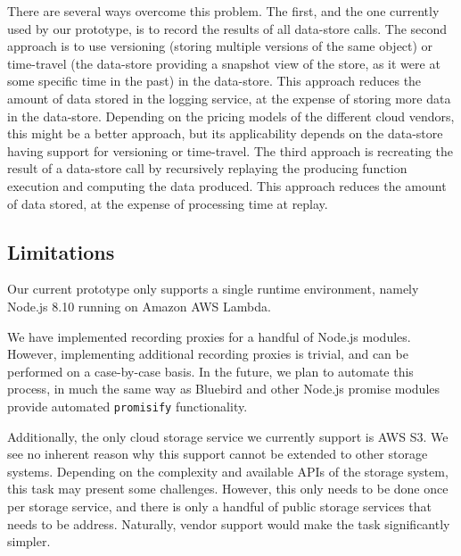 There are several ways overcome this problem. The first, and the one currently used by our prototype, is to record the results of all data-store calls. The second approach is to use versioning (storing multiple versions of the same object) or time-travel (the data-store providing a snapshot view of the store, as it were at some specific time in the past) in the data-store. This approach reduces the amount of data stored in the logging service, at the expense of storing more data in the data-store. Depending on the pricing models of the different cloud vendors, this might be a better approach, but its applicability depends on the data-store having support for versioning or time-travel. The third approach is recreating the result of a data-store call by recursively replaying the producing function execution and computing the data produced. This approach reduces the amount of data stored, at the expense of processing time at replay.

\subsection{Limitations}
Our current prototype only supports a single runtime environment, namely
Node.js 8.10 running on Amazon AWS Lambda.

We have implemented recording proxies for a handful of Node.js modules.
However, implementing additional recording proxies is trivial, and can be
performed on a case-by-case basis. In the future, we plan to automate this
process, in much the same way as Bluebird and other Node.js promise modules
provide automated \verb|promisify| functionality.

Additionally, the only cloud storage service we currently support is AWS S3. We
see no inherent reason why this support cannot be extended to other storage
systems. Depending on the complexity and available APIs of the storage system,
this task may present some challenges. However, this only needs to be done once
per storage service, and there is only a handful of public storage services
that needs to be address. Naturally, vendor support would make the task
significantly simpler.


